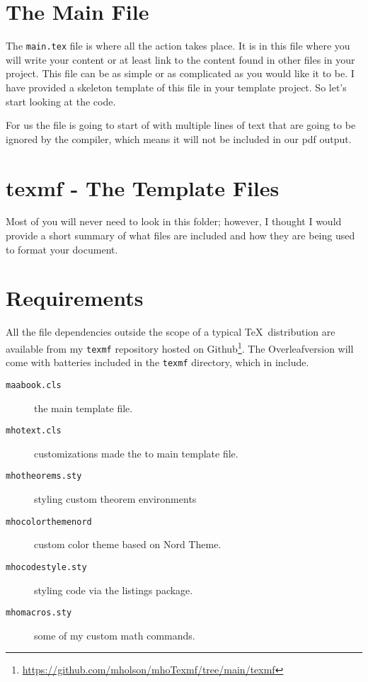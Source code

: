 \section{The Main File}
The \texttt{main.tex} file is where all the action takes place.  It is in this
file where you will write your content or at least link to the content found in
other files in your project.  This file can be as simple or as complicated as 
you would like it to be.  I have provided a skeleton template of this file in
your template project.  So let's start looking at the code.

For us the file is going to start of with multiple lines of text that are going
to be ignored by the compiler, which means it will not be included in our pdf
output.

\section{texmf - The Template Files}

Most of you will never need to look in this folder; however, I thought I would
provide a short summary of what files are included and how they are being used
to format your document.

\section{Requirements}

All the file dependencies outside the scope of a typical \TeX\, distribution
are available from my \texttt{texmf} repository hosted on
Github\footnote{\url{https://github.com/mholson/mhoTexmf/tree/main/texmf}}.
The Overleaf\texttrademark version will come with batteries included in the 
\texttt{texmf} directory, which in include.  
\begin{description}
    \item[\texttt{maabook.cls}] the main template file.
    \item[\texttt{mhotext.cls}] customizations made the to main template file.
    \item[\texttt{mhotheorems.sty}] styling custom theorem environments
    \item[\texttt{mhocolorthemenord}] custom color theme based on Nord Theme.
    \item[\texttt{mhocodestyle.sty}] styling code via the listings package.
    \item[\texttt{mhomacros.sty}] some of my custom math commands.  
\end{description}


